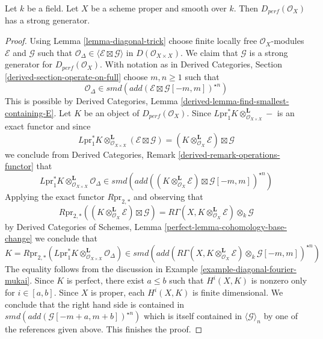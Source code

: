 \begin{lemma}
\label{lemma-smooth-proper-strong-generator}
Let $k$ be a field. Let $X$ be a scheme proper and smooth over $k$.
Then $D_{perf}(\mathcal{O}_X)$
has a strong generator.
\end{lemma}

\begin{proof}
Using Lemma \ref{lemma-diagonal-trick} choose finite locally free
$\mathcal{O}_X$-modules $\mathcal{E}$ and $\mathcal{G}$ such that
$\mathcal{O}_\Delta \in \langle \mathcal{E} \boxtimes \mathcal{G} \rangle$
in $D(\mathcal{O}_{X \times X})$. We claim that $\mathcal{G}$
is a strong generator for $D_{perf}(\mathcal{O}_X)$. With notation as in
Derived Categories, Section \ref{derived-section-operate-on-full}
choose $m, n \geq 1$ such that
$$
\mathcal{O}_\Delta \in
smd(add(\mathcal{E} \boxtimes \mathcal{G}[-m, m])^{\star n})
$$
This is possible by Derived Categories, Lemma
\ref{derived-lemma-find-smallest-containing-E}.
Let $K$ be an object of $D_{perf}(\mathcal{O}_X)$. Since
$L\text{pr}_1^*K \otimes_{\mathcal{O}_{X \times X}}^\mathbf{L} -$
is an exact functor and since
$$
L\text{pr}_1^*K \otimes_{\mathcal{O}_{X \times X}}^\mathbf{L}
(\mathcal{E} \boxtimes \mathcal{G}) =
(K \otimes_{\mathcal{O}_X}^\mathbf{L} \mathcal{E}) \boxtimes \mathcal{G}
$$
we conclude from
Derived Categories, Remark \ref{derived-remark-operations-functor} that
$$
L\text{pr}_1^*K
\otimes_{\mathcal{O}_{X \times X}}^\mathbf{L}
\mathcal{O}_\Delta
\in
smd(add(
(K \otimes_{\mathcal{O}_X}^\mathbf{L} \mathcal{E})
\boxtimes \mathcal{G}[-m, m])^{\star n})
$$
Applying the exact functor $R\text{pr}_{2, *}$ and observing that
$$
R\text{pr}_{2, *}
\left((K \otimes_{\mathcal{O}_X}^\mathbf{L} \mathcal{E}) \boxtimes
\mathcal{G}\right) =
R\Gamma(X, K \otimes_{\mathcal{O}_X}^\mathbf{L} \mathcal{E})
\otimes_k \mathcal{G}
$$
by Derived Categories of Schemes, Lemma
\ref{perfect-lemma-cohomology-base-change} we conclude that
$$
K = R\text{pr}_{2, *}(L\text{pr}_1^*K
\otimes_{\mathcal{O}_{X \times X}}^\mathbf{L} \mathcal{O}_\Delta)
\in
smd(add(R\Gamma(X, K \otimes_{\mathcal{O}_X}^\mathbf{L} \mathcal{E})
\otimes_k \mathcal{G}[-m, m])^{\star n})
$$
The equality follows from the discussion in
Example \ref{example-diagonal-fourier-mukai}.
Since $K$ is perfect, there exist $a \leq b$ such that
$H^i(X, K)$ is nonzero only for $i \in [a, b]$. Since $X$ is proper,
each $H^i(X, K)$ is finite dimensional. We conclude that
the right hand side is contained in
$smd(add(\mathcal{G}[-m + a, m + b])^{\star n})$ which is
itself contained in $\langle \mathcal{G} \rangle_n$ by one of the
references given above. This finishes the proof.
\end{proof}

